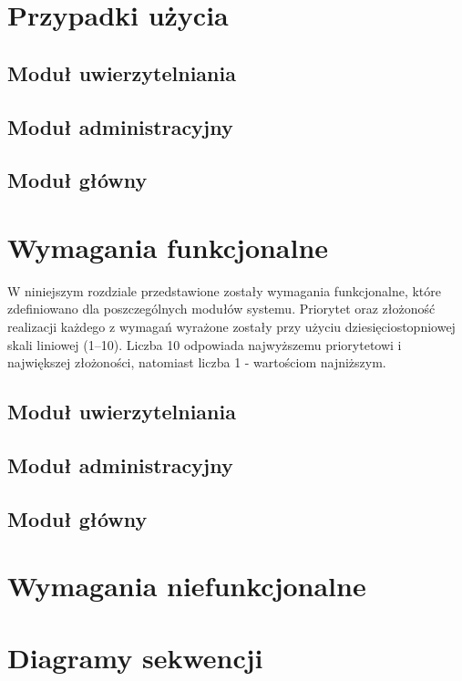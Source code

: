 \documentclass[12pt, oneside, final]{report}
\begin{document}
\chapter{Przypadki użycia}
\section{Moduł uwierzytelniania}

\section{Moduł administracyjny}

\section{Moduł główny}


\chapter{Wymagania funkcjonalne}
W niniejszym rozdziale przedstawione zostały wymagania funkcjonalne, które zdefiniowano dla poszczególnych modułów systemu. Priorytet oraz złożoność realizacji każdego z wymagań wyrażone zostały przy użyciu dziesięciostopniowej skali liniowej (1--10). Liczba 10 odpowiada najwyższemu priorytetowi i największej złożoności, natomiast liczba 1 - wartościom najniższym.
\section{Moduł uwierzytelniania}

\section{Moduł administracyjny}

\section{Moduł główny}


\chapter{Wymagania niefunkcjonalne}


\chapter{Diagramy sekwencji}

\end{document}
